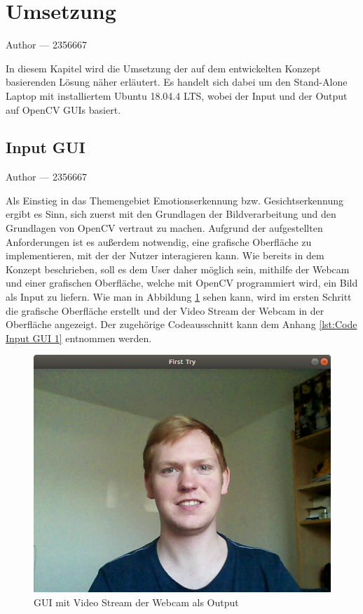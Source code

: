 \documentclass[12pt, a4paper]{report}
\makeatletter
\newcommand{\sectionauthor}[1]{%
  {\parindent0pt\vspace*{-5pt}%
  \large{Author --- }
  \linespread{1.1}\large\scshape#1%
  \par\nobreak\vspace*{35pt} }
  \@afterheading%
}
\makeatother
\begin{document}
\section{Umsetzung}
\sectionauthor{2356667}
In diesem Kapitel wird die Umsetzung der auf dem entwickelten Konzept basierenden Lösung näher erläutert. Es handelt sich dabei um den Stand-Alone Laptop mit installiertem Ubuntu 18.04.4 LTS, wobei der Input und der Output auf OpenCV GUIs basiert.

\subsection{Input GUI}
\sectionauthor{2356667}
Als Einstieg in das Themengebiet Emotionserkennung bzw. Gesichtserkennung ergibt es Sinn, sich zuerst mit den Grundlagen der Bildverarbeitung und den Grundlagen von OpenCV vertraut zu machen. Aufgrund der aufgestellten Anforderungen ist es außerdem notwendig, eine grafische Oberfläche zu implementieren, mit der der Nutzer interagieren kann. Wie bereits in dem Konzept beschrieben, soll es dem User daher möglich sein, mithilfe der Webcam und einer grafischen Oberfläche, welche mit OpenCV programmiert wird, ein Bild als Input zu liefern. Wie man in Abbildung \ref{fig:Input GUI 1} sehen kann, wird im ersten Schritt die grafische Oberfläche erstellt und der Video Stream der Webcam in der Oberfläche angezeigt. Der zugehörige Codeausschnitt kann dem Anhang \ref{lst:Code Input GUI 1} entnommen werden.
\begin{figure}[h]
\includegraphics[width=\linewidth]{Bilder/InputGUI1.png}
\caption{GUI mit Video Stream der Webcam als Output}
\label{fig:Input GUI 1}
\end{figure}
\end{document}
